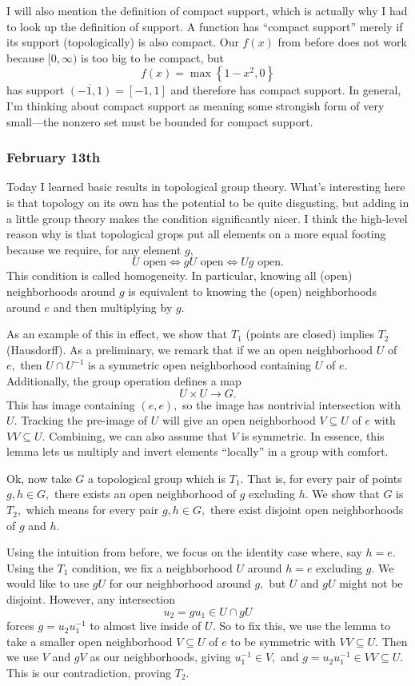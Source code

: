 I will also mention the definition of compact support, which is actually why I had to look up the definition of support. A function has ``compact support'' merely if its support (topologically) is also compact. Our $f(x)$ from before does not work because $[0,\infty)$ is too big to be compact, but
\[f(x)=\max\left\{1-x^2,0\right\}\]
has support $\overline{(-1,1)}=[-1,1]$ and therefore has compact support. In general, I'm thinking about compact support as meaning some strongish form of very small---the nonzero set must be bounded for compact support.

\subsubsection{February 13th}
Today I learned basic results in topological group theory. What's interesting here is that topology on its own has the potential to be quite disgusting, but adding in a little group theory makes the condition significantly nicer. I think the high-level reason why is that topological grops put all elements on a more equal footing because we require, for any element $g,$
\[U\text{ open}\iff gU\text{ open}\iff Ug\text{ open}.\]
This condition is called homogeneity. In particular, knowing all (open) neighborhoods around $g$ is equivalent to knowing the (open) neighborhoods around $e$ and then multiplying by $g.$

As an example of this in effect, we show that $T_1$ (points are closed) implies $T_2$ (Hausdorff). As a preliminary, we remark that if we an open neighborhood $U$ of $e,$ then $U\cap U^{-1}$ is a symmetric open neighborhood containing $U$ of $e.$ Additionally, the group operation defines a map
\[U\times U\to G.\]
This has image containing $(e,e),$ so the image has nontrivial intersection with $U.$ Tracking the pre-image of $U$ will give an open neighborhood $V\subseteq U$ of $e$ with $VV\subseteq U.$ Combining, we can also assume that $V$ is symmetric. In essence, this lemma lets us multiply and invert elements ``locally'' in a group with comfort.

Ok, now take $G$ a topological group which is $T_1.$ That is, for every pair of points $g,h\in G,$ there exists an open neighborhood of $g$ excluding $h.$ We show that $G$ is $T_2,$ which means for every pair $g,h\in G,$ there exist disjoint open neighborhoods of $g$ and $h.$

Using the intuition from before, we focus on the identity case where, say $h=e.$ Using the $T_1$ condition, we fix a neighborhood $U$ around $h=e$ excluding $g.$ We would like to use $gU$ for our neighborhood around $g,$ but $U$ and $gU$ might not be disjoint. However, any intersection
\[u_2=gu_1\in U\cap gU\]
forces $g=u_2u_1^{-1}$ to almost live inside of $U.$ So to fix this, we use the lemma to take a smaller open neighborhood $V\subseteq U$ of $e$ to be symmetric with $VV\subseteq U.$ Then we use $V$ and $gV$ as our neighborhoods, giving $u_1^{-1}\in V,$ and $g=u_2u_1^{-1}\in VV\subseteq U.$ This is our contradiction, proving $T_2.$

